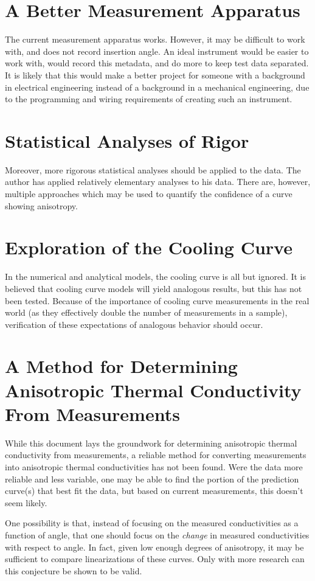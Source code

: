 \section{A Better Measurement Apparatus}

The current measurement apparatus works. However, it may be difficult to work
with, and does not record insertion angle. An ideal instrument would be easier
to work with, would record this metadata, and do more to keep test data
separated. It is likely that this would make a better project for someone with a
background in electrical engineering instead of a background in a mechanical
engineering, due to the programming and wiring requirements of creating such an
instrument.

\section{Statistical Analyses of Rigor}

Moreover, more rigorous statistical analyses should be applied to the data. The
author has applied relatively elementary analyses to his data.
There are, however, multiple approaches which may be used to quantify the
confidence of a curve showing anisotropy.

\section{Exploration of the Cooling Curve}

In the numerical and analytical models, the cooling curve is all but ignored. It
is believed that cooling curve models will yield analogous results, but this has
not been tested. Because of the importance of cooling curve measurements in the
real world (as they effectively double the number of measurements in a sample),
verification of these expectations of analogous behavior should occur.

\section{A Method for Determining Anisotropic Thermal Conductivity From Measurements}

While this document lays the groundwork for determining anisotropic thermal
conductivity from measurements, a reliable method for converting measurements
into anisotropic thermal conductivities has not been found. Were the data
more reliable and less variable, one may be able to find the portion of the
prediction curve(s) that best fit the data, but based on current measurements,
this doesn't seem likely.

One possibility is that, instead of focusing on the measured conductivities as a
function of angle, that one should focus on the \emph{change} in measured
conductivities with respect to angle. In fact, given low enough degrees of
anisotropy, it may be sufficient to compare linearizations of these curves. Only
with more research can this conjecture be shown to be valid.
